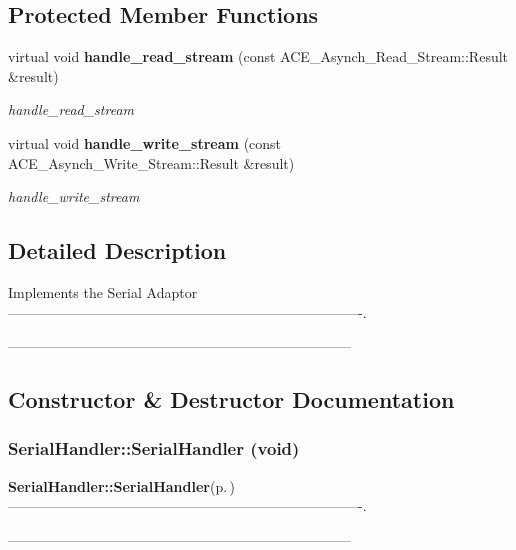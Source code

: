 \subsection*{Protected Member Functions}
\begin{CompactItemize}
\item 
virtual void {\bf handle\_\-read\_\-stream} (const ACE\_\-Asynch\_\-Read\_\-Stream::Result \&result)
\begin{CompactList}\small\item\em handle\_\-read\_\-stream \item\end{CompactList}\item 
virtual void {\bf handle\_\-write\_\-stream} (const ACE\_\-Asynch\_\-Write\_\-Stream::Result \&result)
\begin{CompactList}\small\item\em handle\_\-write\_\-stream \item\end{CompactList}\end{CompactItemize}


\subsection{Detailed Description}
Implements the Serial Adaptor ----------------------------------------------------------------------------. 

-------------------------------------------------------------------------- 



\subsection{Constructor \& Destructor Documentation}
\subsubsection{\setlength{\rightskip}{0pt plus 5cm}Serial\-Handler::Serial\-Handler (void)}\label{classSerialHandler_a0}


{\bf Serial\-Handler::Serial\-Handler}{\rm (p.\,\pageref{classSerialHandler_a0})} ----------------------------------------------------------------------------. 

-------------------------------------------------------------------------- 
